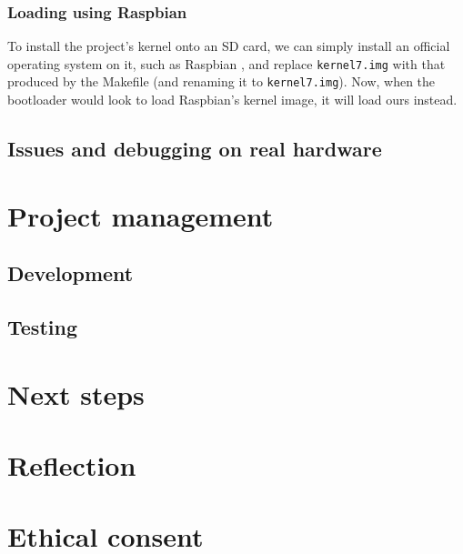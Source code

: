 \documentclass[10pt,a4paper]{article}
\newcommand{\code}[1]{\texttt{#1}}
\begin{document}
\subsubsection{Loading using Raspbian}
To install the project's kernel onto an SD card, we can simply install an
official operating system on it, such as Raspbian \cite{Raspbian}, and replace
\code{kernel7.img} with that produced by the Makefile (and renaming it to
\code{kernel7.img}). Now, when the bootloader would look to load Raspbian's
kernel image, it will load ours instead.

\subsection{Issues and debugging on real hardware}


\section{Project management}
\subsection{Development}
\subsection{Testing}

\section{Next steps}

\section{Reflection}

\section{Ethical consent}



\appendix


\end{document}
